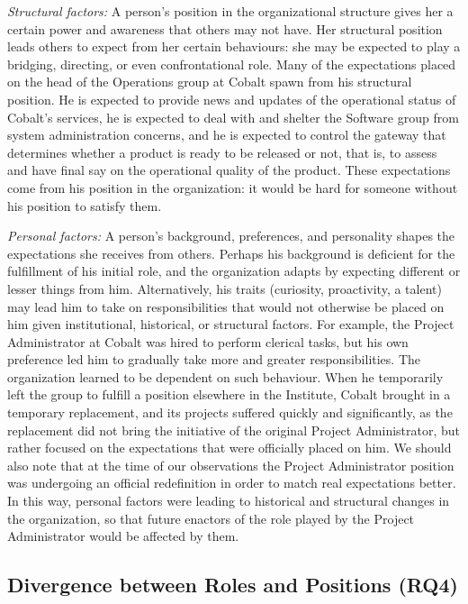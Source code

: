 \documentclass[10pt, conference, compsocconf]{IEEEtran}
\begin{document}
\emph{Structural factors:} A person's position in the organizational structure gives her a certain power and awareness that others may not have. Her structural position leads others to expect from her certain behaviours: she may be expected to play a bridging, directing, or even confrontational role. Many of the expectations placed on the head of the Operations group at Cobalt spawn from his structural position. He is expected to provide news and updates of the operational status of Cobalt's services, he is expected to deal with and shelter the Software group from system administration concerns, and he is expected to control the gateway that determines whether a product is ready to be released or not, that is, to assess and have final say on the operational quality of the product. These expectations come from his position in the organization: it would be hard for someone without his position to satisfy them.

\emph{Personal factors:} A person's background, preferences, and personality shapes the expectations she receives from others. Perhaps his background is deficient for the fulfillment of his initial role, and the organization adapts by expecting different or lesser things from him. Alternatively, his traits (curiosity, proactivity, a talent) may lead him to take on responsibilities that would not otherwise be placed on him given institutional, historical, or structural factors. For example, the Project Administrator at Cobalt was hired to perform clerical tasks, but his own preference led him to gradually take more and greater responsibilities. The organization learned to be dependent on such behaviour. When he temporarily left the group to fulfill a position elsewhere in the Institute, Cobalt brought in a temporary replacement, and its projects suffered quickly and significantly, as the replacement did not bring the initiative of the original Project Administrator, but rather focused on the expectations that were officially placed on him. We should also note that at the time of our observations the Project Administrator position was undergoing an official redefinition in order to match real expectations better. In this way, personal factors were leading to historical and structural changes in the organization, so that future enactors of the role played by the Project Administrator would be affected by them.


\subsection{Divergence between Roles and Positions (RQ4)}
\end{document}
